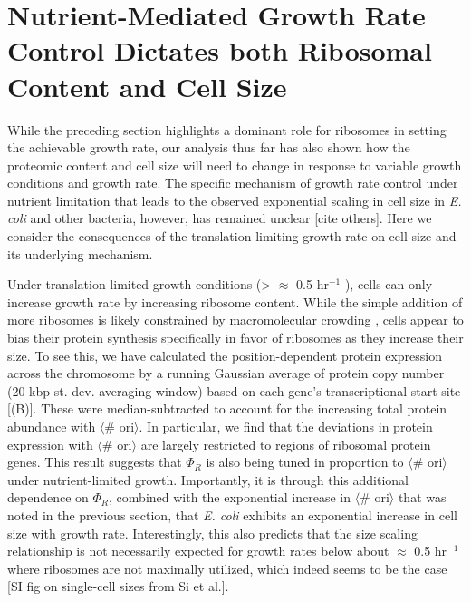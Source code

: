 \section{Nutrient-Mediated Growth Rate Control Dictates both Ribosomal Content and Cell Size}
\label{sec:minimal_model}
While the preceding section highlights a dominant role for ribosomes in setting
the achievable growth rate, our analysis thus far has also shown how the
proteomic content and cell size will need to change in response to variable
growth conditions and growth rate. The specific mechanism of growth rate control
under nutrient limitation that leads to the observed exponential scaling in cell
size in \textit{E. coli} and other bacteria, however, has remained unclear
\citep{si2017}  [cite others]. Here we consider the consequences of the
translation-limiting growth rate on cell size and its underlying mechanism.


%

%
%

Under translation-limited growth conditions (> $\approx$ 0.5 hr$^{-1}$ ), cells can
only increase growth rate by increasing ribosome content. While the simple
addition of more ribosomes is likely constrained by macromolecular crowding
\citep{delarue2018, solerbistue2020}, cells appear to bias their protein
synthesis specifically in favor of ribosomes as they increase their size. To see
this, we have calculated the position-dependent protein expression across the
chromosome by a running Gaussian average of protein copy number (20 kbp st. dev.
averaging window) based on each gene's transcriptional start site
[(B)]. These were median-subtracted to account  for
the increasing total protein abundance with $\langle$\# ori$\rangle$. In
particular, we find that the deviations in protein expression with $\langle$\#
ori$\rangle$ are largely restricted to regions of ribosomal protein genes. This
result suggests that $\Phi_R$ is also being tuned in proportion to $\langle$\#
ori$\rangle$ under nutrient-limited growth. Importantly, it is through this
additional dependence on $\Phi_R$, combined with the exponential increase in
$\langle$\# ori$\rangle$ that was noted in the previous section, that \textit{E.
coli} exhibits an exponential increase in cell size with growth rate.
Interestingly, this also predicts that the size scaling relationship is not
necessarily expected for growth rates below about $\approx$ 0.5 hr$^{-1}$  where
ribosomes are not maximally utilized, which indeed seems to be the case [SI fig
on single-cell sizes from Si et al.].

